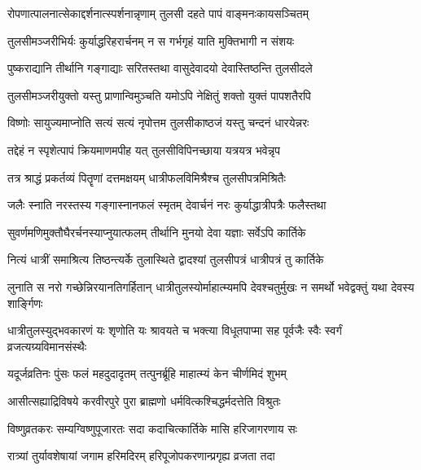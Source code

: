 \twolineshloka
{रोपणात्पालनात्सेकाद्दर्शनात्स्पर्शनान्नृणाम्}
{तुलसी दहते पापं वाङ्मनःकायसञ्चितम्} %

\twolineshloka
{तुलसीमञ्जरीभिर्यः कुर्याद्धरिहरार्चनम्}
{न स गर्भगृहं याति मुक्तिभागी न संशयः} %

\twolineshloka
{पुष्कराद्यानि तीर्थानि गङ्गाद्याः सरितस्तथा}
{वासुदेवादयो देवास्तिष्ठन्ति तुलसीदले} %

\twolineshloka
{तुलसीमञ्जरीयुक्तो यस्तु प्राणान्विमुञ्चति}
{यमोऽपि नेक्षितुं शक्तो युक्तं पापशतैरपि} %

\twolineshloka
{विष्णोः सायुज्यमाप्नोति सत्यं सत्यं नृपोत्तम}
{तुलसीकाष्ठजं यस्तु चन्दनं धारयेन्नरः} %

\twolineshloka
{तद्देहं न स्पृशेत्पापं क्रियमाणमपीह यत्}
{तुलसीविपिनच्छाया यत्रयत्र भवेन्नृप} %

\twolineshloka
{तत्र श्राद्धं प्रकर्तव्यं पितॄणां दत्तमक्षयम्}
{धात्रीफलविमिश्रैश्च तुलसीपत्रमिश्रितैः} %

\twolineshloka
{जलैः स्नाति नरस्तस्य गङ्गास्नानफलं स्मृतम्}
{देवार्चनं नरः कुर्याद्धात्रीपत्रैः फलैस्तथा} %

\twolineshloka
{सुवर्णमणिमुक्तौघैरर्चनस्याप्नुयात्फलम्}
{तीर्थानि मुनयो देवा यज्ञाः सर्वेऽपि कार्तिके} %

\twolineshloka
{नित्यं धात्रीं समाश्रित्य तिष्ठन्त्यर्के तुलास्थिते}
{द्वादश्यां तुलसीपत्रं धात्रीपत्रं तु कार्तिके} %

\threelineshloka
{लुनाति स नरो गच्छेन्निरयानतिगर्हितान्}
{धात्रीतुलस्योर्माहात्म्यमपि देवश्चतुर्मुखः}
{न समर्थो भवेद्वक्तुं यथा देवस्य शार्ङ्गिणः} %

\twolineshloka
{धात्रीतुलस्युद्भवकारणं यः शृणोति यः श्रावयते च भक्त्या}
{विधूतपाप्मा सह पूर्वजैः स्वैः स्वर्गं व्रजत्यग्र्यविमानसंस्थैः} %





\twolineshloka
{यदूर्जव्रतिनः पुंसः फलं महदुदादृतम्}
{तत्पुनर्ब्रूहि माहात्म्यं केन चीर्णमिदं शुभम्} %


\twolineshloka
{आसीत्सह्याद्रिविषये करवीरपुरे पुरा}
{ब्राह्मणो धर्मवित्कश्चिद्धर्मदत्तेति विश्रुतः} %

\twolineshloka
{विष्णुव्रतकरः सम्यग्विष्णुपूजारतः सदा}
{कदाचित्कार्तिके मासि हरिजागरणाय सः} %

\twolineshloka
{रात्र्यां तुर्यावशेषायां जगाम हरिमदिरम्}
{हरिपूजोपकरणान्प्रगृह्य व्रजता तदा} %

